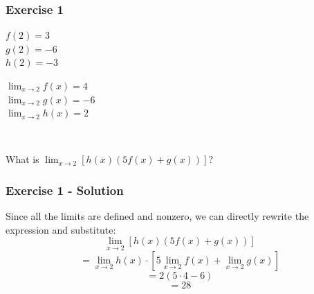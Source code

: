 \documentclass[12pt]{beamer}
\begin{document}
\begin{frame}
	\frametitle{Exercise 1}
	\vspace*{\fill}
	\vspace*{\fill}
	\initclock
	\large
	\begin{minipage}{0.5\textwidth} %
		\begin{center} %
			$f(2) = 3$\\
			$g(2) = -6$\\
			$h(2) = -3$
		\end{center}
	\end{minipage}%
	\begin{minipage}{0.5\textwidth}
		\begin{center}
			$\displaystyle\lim_{x\to2}f(x) = 4$\\
			$\displaystyle\lim_{x\to2}g(x) = -6$\\
			$\displaystyle\lim_{x\to2}h(x) = 2$ %
		\end{center}
	\end{minipage}\\
	\vspace*{\fill}
	\begin{center}
		What is $\displaystyle\lim_{x\to2}[h(x)(5f(x)+g(x))]$?\\
	\end{center}
	\vspace*{\fill}
	\vspace*{\fill}
	\crono
\end{frame}
\begin{frame}
	\frametitle{Exercise 1 - Solution}
	Since all the limits are defined and nonzero, we can directly rewrite the expression and substitute:
	\[\displaystyle\lim_{x\to2}[h(x)(5f(x)+g(x))]\]
	\[= \displaystyle\lim_{x\to2}h(x)\cdot\left[5\displaystyle\lim_{x\to2}f(x)+\displaystyle\lim_{x\to2}g(x)\right]\]
	\[= 2(5\cdot4 - 6)\]
	\[= \boxed{28}\]

\end{frame}
\end{document}

